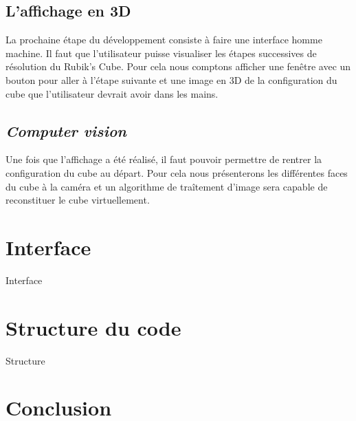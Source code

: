\documentclass[a4paper]{report}
\begin{document}
\section{L'affichage en 3D}
La prochaine étape du développement consiste à faire une interface homme machine. Il faut que l'utilisateur puisse visualiser les étapes successives de résolution du Rubik's Cube. Pour cela nous comptons afficher une fenêtre avec un bouton pour aller à l'étape suivante et une image en 3D de la configuration du cube que l'utilisateur devrait avoir dans les mains.

\section{\textit{Computer vision}}
Une fois que l'affichage a été réalisé, il faut pouvoir permettre de rentrer la configuration du cube au départ. Pour cela nous présenterons les différentes faces du cube à la caméra et un algorithme de traîtement d'image sera capable de reconstituer le cube virtuellement.

\chapter{Interface}
Interface

\chapter{Structure du code}
Structure

\chapter*{Conclusion}
\end{document}
